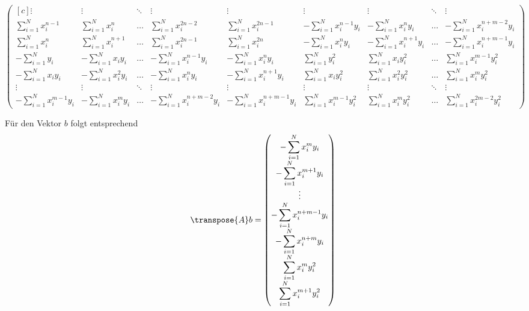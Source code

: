 \begin{loesung}
\begin{small}
\[\begin{pmatrix*}[c]
\vdots
	&\vdots
	&\ddots
	&\vdots
	&\vdots
	&\vdots
	&\vdots
	&\ddots
	&\vdots
\\
\displaystyle\sum_{i=1}^N x_i^{n-1}
	& \displaystyle\sum_{i=1}^N x_i^{n}
	& \dots
	& \displaystyle\sum_{i=1}^N x_i^{2n-2}
	& \displaystyle\sum_{i=1}^N x_i^{2n-1}
	& -\displaystyle\sum_{i=1}^N x_i^{n-1}y_i
	& -\displaystyle\sum_{i=1}^N x_i^ny_i
	& \dots
	& -\displaystyle\sum_{i=1}^N x_i^{n+m-2}y_i
\\
\displaystyle\sum_{i=1}^N x_i^{n}
	& \displaystyle\sum_{i=1}^N x_i^{n+1}
	& \dots
	& \displaystyle\sum_{i=1}^N x_i^{2n-1}
	& \displaystyle\sum_{i=1}^N x_i^{2n}
	& -\displaystyle\sum_{i=1}^N x_i^{n}y_i
	& -\displaystyle\sum_{i=1}^N x_i^{n+1}y_i
	& \dots
	& -\displaystyle\sum_{i=1}^N x_i^{n+m-1}y_i
\\
-\displaystyle\sum_{i=1}^N y_i
	& -\displaystyle\sum_{i=1}^N x_iy_i
	& \dots
	& -\displaystyle\sum_{i=1}^N x_i^{n-1}y_i
	& -\displaystyle\sum_{i=1}^N x_i^{n}y_i
	& \displaystyle\sum_{i=1}^N y_i^2
	& \displaystyle\sum_{i=1}^N x_iy_i^2
	& \dots
	& \displaystyle\sum_{i=1}^N x_i^{m-1}y_i^2
\\
-\displaystyle\sum_{i=1}^N x_iy_i
	& -\displaystyle\sum_{i=1}^N x_i^2y_i
	& \dots
	& -\displaystyle\sum_{i=1}^N x_i^{n}y_i
	& -\displaystyle\sum_{i=1}^N x_i^{n+1}y_i
	& \displaystyle\sum_{i=1}^N x_iy_i^2
	& \displaystyle\sum_{i=1}^N x_i^2y_i^2
	& \dots
	& \displaystyle\sum_{i=1}^N x_i^{m}y_i^2
\\
\vdots
	&\vdots
	&\ddots
	&\vdots
	&\vdots
	&\vdots
	&\vdots
	&\ddots
	&\vdots
\\
-\displaystyle\sum_{i=1}^N x_i^{m-1}y_i
	& -\displaystyle\sum_{i=1}^N x_i^my_i
	& \dots
	& -\displaystyle\sum_{i=1}^N x_i^{n+m-2}y_i
	& -\displaystyle\sum_{i=1}^N x_i^{n+m-1}y_i
	& \displaystyle\sum_{i=1}^N x_i^{m-1}y_i^2
	& \displaystyle\sum_{i=1}^N x_i^{m}y_i^2
	& \dots
	& \displaystyle\sum_{i=1}^N x_i^{2m-2}y_i^2
\end{pmatrix*}
\]
\end{small}
Für den Vektor $b$ folgt entsprechend
\[
\transpose{A}b
=
\begin{pmatrix}
-\displaystyle\sum_{i=1}^N x_i^my_i \\
-\displaystyle\sum_{i=1}^N x_i^{m+1}y_i \\
\vdots \\
-\displaystyle\sum_{i=1}^N x_i^{n+m-1}y_i \\
-\displaystyle\sum_{i=1}^N x_i^{n+m}y_i \\
\displaystyle\sum_{i=1}^N x_i^{m}y_i^2 \\
\displaystyle\sum_{i=1}^N x_i^{m+1}y_i^2 \\

\end{pmatrix}\]
\end{loesung}
